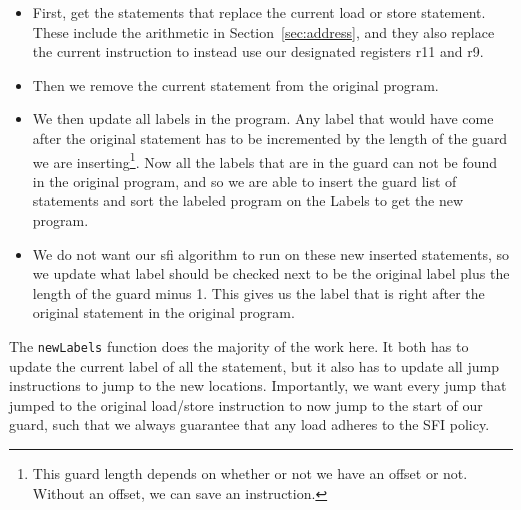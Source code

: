 \begin{itemize}
  \item First, get the statements that replace the current load or store
    statement. These include the arithmetic in Section~\ref{sec:address}, and
    they also replace the current instruction to instead use our designated
    registers r11 and r9.
  \item Then we remove the current statement from the original program.
  \item We then update all labels in the program. Any label that would have
    come after the original statement has to be incremented by the length of
    the guard we are inserting\footnote{This guard length depends on whether or
    not we have an offset or not. Without an offset, we can save an
  instruction.}. Now all the labels that are in the guard can not be found in
  the original program, and so we are able to insert the guard list of
  statements and sort the labeled program on the Labels to get the new program.
  \item We do not want our sfi algorithm to run on these new inserted
    statements, so we update what label should be checked next to be the
    original label plus the length of the guard minus 1. This gives us the
    label that is right after the original statement in the original program.
\end{itemize}

The \texttt{newLabels} function does the majority of the work here. It both has
to update the current label of all the statement, but it also has to update all
jump instructions to jump to the new locations. Importantly, we want every jump
that jumped to the original load/store instruction to now jump to the start of
our guard, such that we always guarantee that any load adheres to the SFI
policy.
